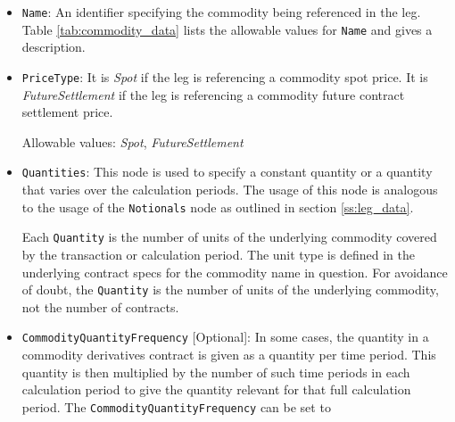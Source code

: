\begin{itemize}

\item
\lstinline!Name!: An identifier specifying the commodity being referenced in the leg. 
Table \ref{tab:commodity_data} lists the allowable values for \lstinline!Name! and gives a description.

\item
\lstinline!PriceType!:  It is \emph{Spot} if the leg is referencing a commodity spot price. It is \emph{FutureSettlement} if the leg is referencing a commodity future contract settlement price.

Allowable values: \emph{Spot}, \emph{FutureSettlement} 

\item
\lstinline!Quantities!: This node is used to specify a constant quantity or a quantity that varies over the calculation periods. The usage of this node is analogous to the usage of the \lstinline!Notionals! node as outlined in section \ref{ss:leg_data}. 

Each \lstinline!Quantity! is the number of units of the underlying commodity covered by the transaction or calculation period. The unit type is defined in the underlying contract specs for the commodity name in question. For avoidance of doubt, the \lstinline!Quantity! is the number of units of the underlying commodity, not the number of contracts.

\item
\lstinline!CommodityQuantityFrequency! [Optional]: In some cases, the quantity in a commodity derivatives contract is given as a quantity per time period. This quantity is then multiplied by the number of such time periods in each calculation period to give the quantity relevant for that full calculation period. The \lstinline!CommodityQuantityFrequency! can be set to


\end{itemize}
